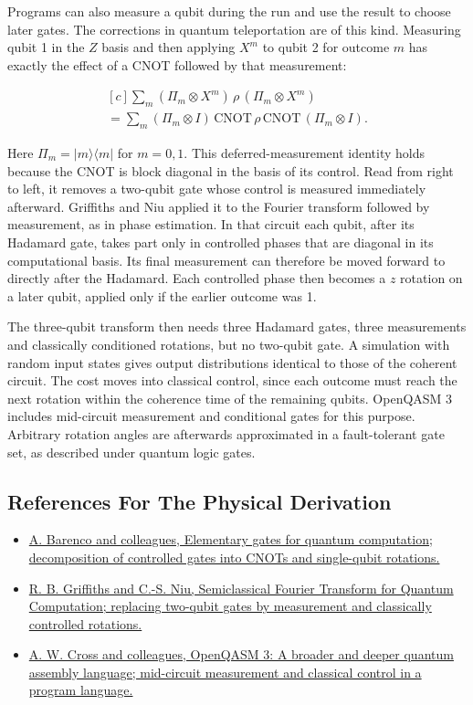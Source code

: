 \documentclass[11pt,oneside]{book}
\newenvironment{centeredalign}{\[\begin{gathered}[c]}{\end{gathered}\]}
\begin{document}
Programs can also measure a qubit during the run and use the result to choose later gates. The corrections in quantum teleportation are of this kind. Measuring qubit 1 in the \(Z\) basis and then applying \(X^m\) to qubit 2 for outcome \(m\) has exactly the effect of a CNOT followed by that measurement:

\begin{centeredalign}
\sum_{m}(\Pi_m\otimes X^m)\,\rho\,(\Pi_m\otimes X^m)\\
=\sum_{m}(\Pi_m\otimes I)\,\mathrm{CNOT}\,\rho\,\mathrm{CNOT}\,(\Pi_m\otimes I).
\end{centeredalign}

Here \(\Pi_m=|m\rangle\langle m|\) for \(m=0,1\). This deferred-measurement identity holds because the CNOT is block diagonal in the basis of its control. Read from right to left, it removes a two-qubit gate whose control is measured immediately afterward. Griffiths and Niu applied it to the Fourier transform followed by measurement, as in phase estimation. In that circuit each qubit, after its Hadamard gate, takes part only in controlled phases that are diagonal in its computational basis. Its final measurement can therefore be moved forward to directly after the Hadamard. Each controlled phase then becomes a \(z\) rotation on a later qubit, applied only if the earlier outcome was 1.

The three-qubit transform then needs three Hadamard gates, three measurements and classically conditioned rotations, but no two-qubit gate. A simulation with random input states gives output distributions identical to those of the coherent circuit. The cost moves into classical control, since each outcome must reach the next rotation within the coherence time of the remaining qubits. OpenQASM 3 includes mid-circuit measurement and conditional gates for this purpose. Arbitrary rotation angles are afterwards approximated in a fault-tolerant gate set, as described under quantum logic gates.

\subsection*{References For The Physical Derivation}
\begin{itemize}
\item \href{https://arxiv.org/abs/quant-ph/9503016}{A. Barenco and colleagues, Elementary gates for quantum computation; decomposition of controlled gates into CNOTs and single-qubit rotations.}
\item \href{https://arxiv.org/abs/quant-ph/9511007}{R. B. Griffiths and C.-S. Niu, Semiclassical Fourier Transform for Quantum Computation; replacing two-qubit gates by measurement and classically controlled rotations.}
\item \href{https://arxiv.org/abs/2104.14722}{A. W. Cross and colleagues, OpenQASM 3: A broader and deeper quantum assembly language; mid-circuit measurement and classical control in a program language.}
\end{itemize}
\end{document}
